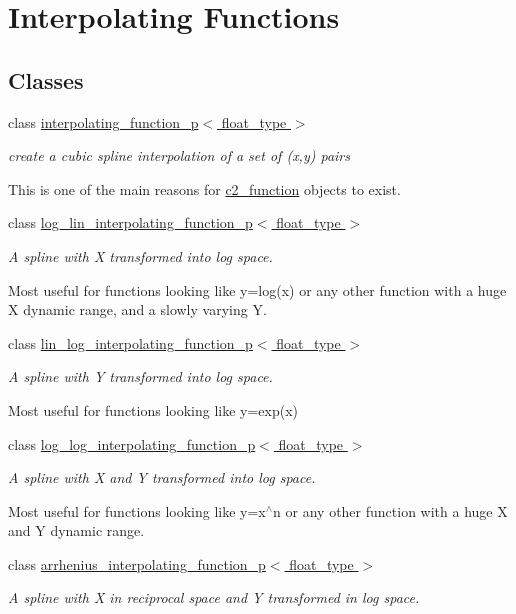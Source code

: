 \hypertarget{group__interpolators}{\section{Interpolating Functions}
\label{group__interpolators}
}
\subsection*{Classes}
\begin{DoxyCompactItemize}
\item 
class \hyperlink{classinterpolating__function__p}{interpolating\-\_\-function\-\_\-p$<$ float\-\_\-type $>$}
\begin{DoxyCompactList}\small\item\em create a cubic spline interpolation of a set of (x,y) pairs

This is one of the main reasons for \hyperlink{classc2__function}{c2\-\_\-function} objects to exist. \end{DoxyCompactList}\item 
class \hyperlink{classlog__lin__interpolating__function__p}{log\-\_\-lin\-\_\-interpolating\-\_\-function\-\_\-p$<$ float\-\_\-type $>$}
\begin{DoxyCompactList}\small\item\em A spline with X transformed into log space.

Most useful for functions looking like y=log(x) or any other function with a huge X dynamic range, and a slowly varying Y. \end{DoxyCompactList}\item 
class \hyperlink{classlin__log__interpolating__function__p}{lin\-\_\-log\-\_\-interpolating\-\_\-function\-\_\-p$<$ float\-\_\-type $>$}
\begin{DoxyCompactList}\small\item\em A spline with Y transformed into log space.

Most useful for functions looking like y=exp(x) \end{DoxyCompactList}\item 
class \hyperlink{classlog__log__interpolating__function__p}{log\-\_\-log\-\_\-interpolating\-\_\-function\-\_\-p$<$ float\-\_\-type $>$}
\begin{DoxyCompactList}\small\item\em A spline with X and Y transformed into log space.

Most useful for functions looking like y=x$^\wedge$n or any other function with a huge X and Y dynamic range. \end{DoxyCompactList}\item 
class \hyperlink{classarrhenius__interpolating__function__p}{arrhenius\-\_\-interpolating\-\_\-function\-\_\-p$<$ float\-\_\-type $>$}
\begin{DoxyCompactList}\small\item\em A spline with X in reciprocal space and Y transformed in log space.


\end{DoxyCompactList}
\end{DoxyCompactItemize}
